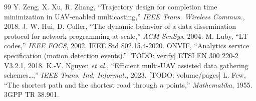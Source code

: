 \documentclass[conference]{IEEEtran}
\begin{document}
\begin{thebibliography}{99}
\bibitem{} Y. Zeng, X. Xu, R. Zhang, ``Trajectory design for completion time minimization in UAV-enabled multicasting,'' \emph{IEEE Trans. Wireless Commun.}, 2018.
\bibitem{} J. W. Hui, D. Culler, ``The dynamic behavior of a data dissemination protocol for network programming at scale,'' \emph{ACM SenSys}, 2004.
\bibitem{} M. Luby, ``LT codes,'' \emph{IEEE FOCS}, 2002.
\bibitem{} IEEE Std 802.15.4-2020.
\bibitem{} ONVIF, ``Analytics service specification (motion detection events).'' [TODO: verify]
\bibitem{} ETSI EN 300 220-2 V3.2.1, 2018.
\bibitem{} K.-V. Nguyen \emph{et al.}, ``Efficient multi-UAV assisted data gathering schemes\dots,'' \emph{IEEE Trans. Ind. Informat.}, 2023. [TODO: volume/pages]
\bibitem{} L. Few, ``The shortest path and the shortest road through $n$ points,'' \emph{Mathematika}, 1955.
\bibitem{} 3GPP TR 38.901.
\end{thebibliography}
\end{document}
